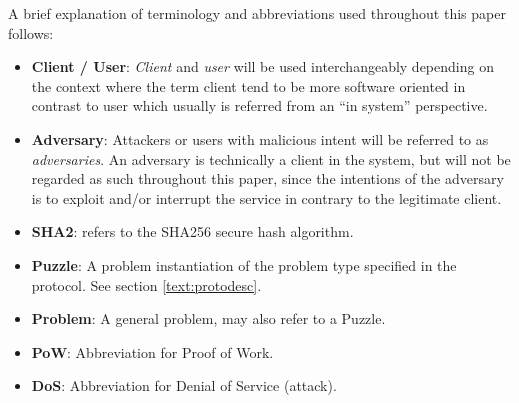 \begin{comment}
Throughout this paper attackers or users with malicious intent will be referred to as \emph{adversaries}.
\emph{Client} and \emph{user} will be used interchangeably depending on the context where the term client tend to be more software oriented in contrast to user which usually is referred from an ``in system'' perspective.
An adversary is technically a client in the system, but will not be regarded as such throughout this paper, since the intentions of the adversary is to exploit and/or interrupt the service in contrary to the legitimate client. 
\end{comment}
A brief explanation of terminology and abbreviations used throughout this paper follows:
\begin{itemize}
\item \textbf{Client / User}: \emph{Client} and \emph{user} will be used interchangeably depending on the context where the term client tend to be more software oriented in contrast to user which usually is referred from an ``in system'' perspective.
\item \textbf{Adversary}: Attackers or users with malicious intent will be referred to as \emph{adversaries}. An adversary is technically a client in the system, but will not be regarded as such throughout this paper, since the intentions of the adversary is to exploit and/or interrupt the service in contrary to the legitimate client. 
\item {\textbf{SHA2}}: refers to the SHA256 secure hash algorithm\cite{sha2}.
\item \textbf{Puzzle}: A problem instantiation of the problem type specified in the protocol. See section \ref{text:protodesc}.
\item \textbf{Problem}: A general problem, may also refer to a Puzzle.
\item \textbf{PoW}: Abbreviation for Proof of Work.
\item \textbf{DoS}: Abbreviation for Denial of Service (attack).
\end{itemize}
